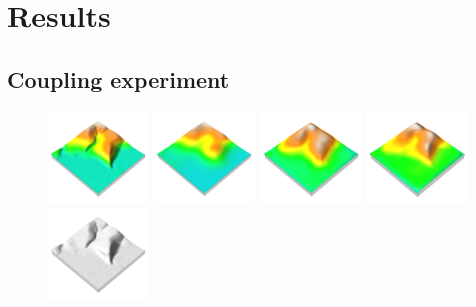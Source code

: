 \documentclass[prodmode,acmtochi]{acmsmall} %
\begin{document}
\pagebreak

\section{Results}

\subsection{Coupling experiment}

\begin{figure}[h!]
\begin{center}
		\includegraphics[width=0.24\textwidth]{images/render_3d/dem_1.png}
		\includegraphics[width=0.24\textwidth]{images/render_3d/mean_dem_1.png}
		\includegraphics[width=0.24\textwidth]{images/render_3d/mean_dem_2.png}
		\includegraphics[width=0.24\textwidth]{images/render_3d/mean_dem_3.png}
		\includegraphics[width=0.24\textwidth]{images/render_3d/dem_difference_1.png}

\end{center}
\end{figure}
\end{document}
